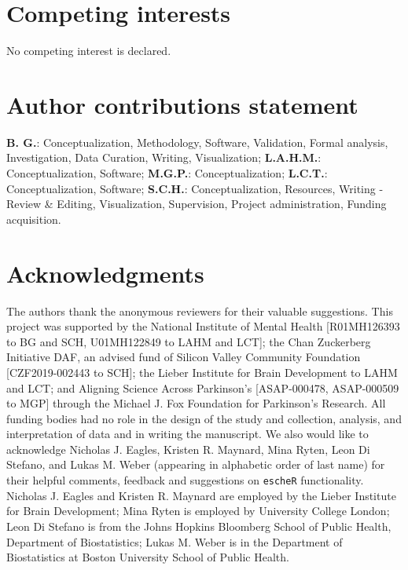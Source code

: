 \documentclass[unnumsec,webpdf,modern,large,namedate]{oup-authoring-template}%
\theoremstyle{thmstyleone}%
\theoremstyle{thmstyletwo}%
\theoremstyle{thmstylethree}%
\begin{document}
\section{Competing interests}
No competing interest is declared.

\section{Author contributions statement}
\textbf{B. G.}:  Conceptualization, Methodology, Software, Validation, Formal analysis, Investigation, Data Curation, Writing, Visualization; 
\textbf{L.A.H.M.}: Conceptualization, Software;
\textbf{M.G.P.}: Conceptualization;
\textbf{L.C.T.}: Conceptualization, Software;
 \textbf{S.C.H.}: Conceptualization, Resources, Writing - Review \& Editing, Visualization, Supervision, Project administration, Funding acquisition.

\section{Acknowledgments}
The authors thank the anonymous reviewers for their valuable suggestions. This project was supported by the National Institute of Mental Health [R01MH126393 to BG and SCH, U01MH122849 to LAHM and LCT]; the Chan Zuckerberg Initiative DAF, an advised fund of Silicon Valley Community Foundation [CZF2019-002443 to SCH]; the Lieber Institute for Brain Development to LAHM and LCT; and Aligning Science Across Parkinson’s [ASAP-000478, ASAP-000509 to MGP] through the Michael J. Fox Foundation for Parkinson’s Research.  All funding bodies had no role in the design of the study and collection, analysis, and interpretation of data and in writing the manuscript. We also would like to acknowledge Nicholas J. Eagles, Kristen R. Maynard, Mina Ryten, Leon Di Stefano, and Lukas M. Weber (appearing in alphabetic order of last name) for their helpful comments, feedback and suggestions on \texttt{escheR} functionality. Nicholas J. Eagles and Kristen R. Maynard are employed by the Lieber Institute for Brain Development; Mina Ryten is employed by University College London; Leon Di Stefano is from the Johns Hopkins Bloomberg School of Public Health, Department of Biostatistics; Lukas M. Weber is in the Department of Biostatistics at Boston University School of Public Health.  


% 
% 




\end{document}
